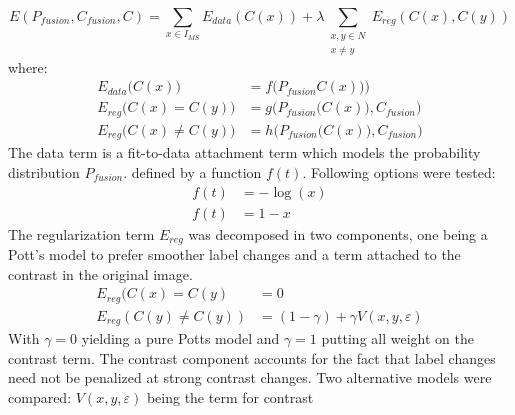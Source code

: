 \documentclass[10pt]{article}
\begin{document}
\[E(P_{fusion},C_{fusion},C)=\sum_{x\in I_{MS}}E_{data}(C(x))+\lambda\sum _{\substack{x,y\in N\\x\neq y}}E_{reg}(C(x),C(y)) \]
where:
\begin{align}
E_{data}\big(C(x)\big)&=f\Big(P_{fusion}C(x)\big)\Big)\\
E_{reg}\big(C(x)=C(y)\big)&=g\Big(P_{fusion}\big(C(x)\big),C_{fusion}\Big)\\
E_{reg}\big(C(x)\neq C(y)\big)&=h\Big(P_{fusion}\big(C(x)\big),C_{fusion}\Big)
\end{align}
The data term is a fit-to-data attachment term which models the probability distribution $P_{fusion}$. defined by a function $f(t)$. Following options were tested:
\begin{align}
f(t)&=-\log(x)\\
f(t)&=1-x
\end{align}
The regularization term $E_{reg}$ was decomposed in two components, one being a Pott's model to prefer smoother label changes and a term attached to the contrast in the original image.
\begin{align}
    E_{reg}(C(x)=C(y)&=0\\ 
    E_{reg}(C(y)\neq C(y))&=(1-\gamma)+\gamma V(x,y,\varepsilon)
\end{align}
With $\gamma = 0$ yielding a pure Potts model and $\gamma = 1$ putting all weight on the contrast term. The contrast component accounts for the fact that label changes need not be penalized at strong contrast changes. Two alternative models were compared:
$V(x,y,\varepsilon)$ being the term for contrast
\end{document}
